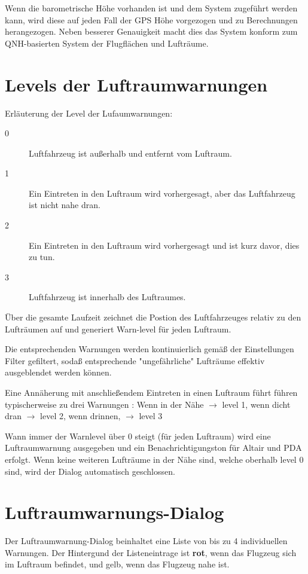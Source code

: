 Wenn die barometrische Höhe vorhanden ist und dem System zugeführt werden kann, wird diese auf
jeden Fall der GPS Höhe vorgezogen und zu Berechnungen herangezogen.
Neben besserer Genauigkeit macht dies das System konform zum QNH-basierten System der
Flugflächen und Lufträume.

\section{Levels der Luftraumwarnungen}\label{airspace-level}

Erläuterung der Level der Lufaumwarnungen:
\begin{description}
\item[0] Luftfahrzeug ist außerhalb und entfernt vom Luftraum.
\item[1] Ein Eintreten in den Luftraum wird vorhergesagt, aber das Luftfahrzeug ist nicht nahe dran.
\item[2] Ein Eintreten in den Luftraum wird vorhergesagt und ist kurz davor, dies zu tun.
\item[3] Luftfahrzeug ist innerhalb des Luftraumes.
\end{description}

Über die gesamte Laufzeit zeichnet \xc die Postion des Luftfahrzeuges  relativ zu den
Lufträumen auf und generiert Warn-level für jeden Luftraum.

Die entsprechenden Warnungen werden kontinuierlich gemäß der Einstellungen
Filter gefiltert, sodaß entsprechende "ungefährliche" Lufträume effektiv ausgeblendet
 werden können.

Eine Annäherung mit anschließendem Eintreten in einen Luftraum führt führen typischerweise zu drei Warnungen :
Wenn in der Nähe $\rightarrow$ level 1, wenn dicht dran $\rightarrow$ level 2, wenn drinnen, $\rightarrow$ level 3

Wann immer der Warnlevel über 0 steigt (für jeden Luftraum) wird eine
Luftraumwarnung ausgegeben und ein Benachrichtigungston für Altair und PDA erfolgt.
Wenn keine weiteren Lufträume in der Nähe sind, welche oberhalb level 0 sind,
wird der Dialog automatisch geschlossen.


\section{Luftraumwarnungs-Dialog}

Der Luftraumwarnung-Dialog beinhaltet eine Liste von bis zu 4 individuellen  Warnungen.
Der Hintergund der Listeneintrage ist \textcolor[rgb]{0.97,0.17,0.19}{\textbf{rot}}, wenn das Flugzeug
sich im Luftraum befindet, und gelb, wenn das Flugzeug nahe ist.

